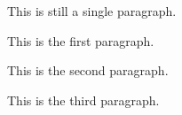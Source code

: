 This is still a single paragraph.


This is the first paragraph.


This is the second paragraph.


This is the third paragraph.

